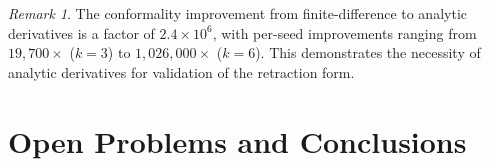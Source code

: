 \documentclass[11pt,a4paper]{article}
\theoremstyle{plain}
\theoremstyle{definition}
\theoremstyle{remark}
\newtheorem{remark}[theorem]{Remark}
\begin{document}
\begin{remark}
  The conformality improvement from finite-difference to analytic
  derivatives is a factor of $2.4 \times 10^6$, with per-seed
  improvements ranging from $19{,}700\times$ ($k=3$) to
  $1{,}026{,}000\times$ ($k=6$).  This demonstrates the necessity
  of analytic derivatives for validation of the retraction form.
\end{remark}


\section{Open Problems and Conclusions}\label{sec:open}
\end{document}
